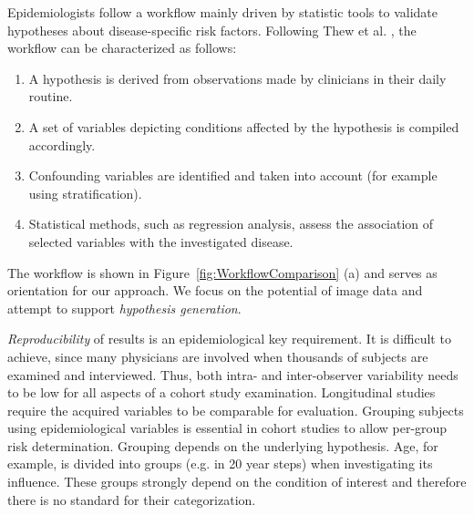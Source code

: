 \documentclass[journal]{style/vgtc} 			          %
\begin{document}
%
Epidemiologists follow a workflow mainly driven by statistic tools to validate hypotheses about disease-specific risk factors.
%
Following Thew et al. \cite{Thew2009}, the workflow can be characterized as follows:
%
\begin{enumerate}\itemsep0.1em
	\item A hypothesis is derived from observations made by clinicians in their daily routine.
%
	\item A set of variables depicting conditions affected by the hypothesis is compiled accordingly.
%
	\item Confounding variables are identified and taken into account (for example using stratification).
%
	\item Statistical methods, such as regression analysis, assess the association of selected variables with the investigated disease.
%
\end{enumerate}
The workflow is shown in Figure~\ref{fig:WorkflowComparison} (a) and serves as orientation for our approach. %
%
We focus on the potential of image data and attempt to support \emph{hypothesis generation}.

\emph{Reproducibility} of results is an epidemiological key requirement.
%
It is difficult to achieve, since many physicians are involved when thousands of subjects are examined and interviewed.
%
Thus, both intra- and inter-observer variability needs to be low for all aspects of a cohort study examination.
%
Longitudinal studies require the acquired variables to be comparable for evaluation.
%
%
%
Grouping subjects using epidemiological variables is essential in cohort studies to allow per-group risk determination.
%
Grouping depends on the underlying hypothesis.
%
Age, for example, is divided into groups (e.g. in 20 year steps) when investigating its influence.
%
These groups strongly depend on the condition of interest and therefore there is no standard for their categorization.
\end{document}
